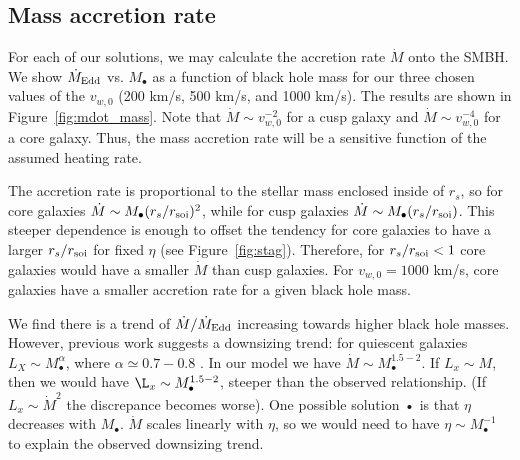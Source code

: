 \documentclass[usenatbib,fleqn]{mn2e}
\newcommand{\Mdot}{\dot{M}}
\newcommand{\eddr}{\dot{M}/\dot{M}_{\rm Edd}}
\newcommand{\Mdote}{\dot{M}_{\rm Edd}}
\newcommand{\rs}{r_s}
\newcommand{\Mbh}[1][]{M_{\bullet#1}}
\newcommand{\soi}{\rm soi}
\newcommand{\rsoi}{r_{\soi}}
\newcommand{\vwO}{v_{w,0}}
\begin{document}
\subsection{Mass accretion rate}
For each of our solutions, we may calculate the accretion rate
$\dot{M}$ onto the SMBH. We show $\Mdote$ vs. $\Mbh$ as a function of
black hole mass for our three chosen values of the $\vwO$ (200 km/s,
500 km/s, and 1000 km/s). The results are shown in
Figure~\ref{fig:mdot_mass}.  Note that $\dot{M}\sim\vwO^{-2}$ for a
cusp galaxy and $\dot{M}\sim\vwO^{-4}$ for a core galaxy. Thus, the
mass accretion rate will be a sensitive function of the assumed
heating rate.

The accretion rate is proportional to the stellar mass enclosed inside
of $\rs$, so for core galaxies $\dot{M}\sim \Mbh (\rs/\rsoi)^{2}$,
while for cusp galaxies $\dot{M}\sim \Mbh (\rs/\rsoi)$.  This steeper
dependence is enough to offset the tendency for core galaxies to have
a larger $\rs/\rsoi$ for fixed $\eta$ (see
Figure~\ref{fig:stag}). Therefore, for $\rs/\rsoi<1$ core galaxies
would have a smaller $\dot{M}$ than cusp galaxies.  For $\vwO=1000$
km/s, core galaxies have a smaller accretion rate for a given black
hole mass.

We find there is a trend of $\eddr$ increasing towards higher black
hole masses. However, previous work suggests a downsizing trend: for
quiescent galaxies $L_X \sim \Mbh^\alpha$, where $\alpha\simeq
0.7-0.8$ \citep{MillerGallo+:2014a}. In our model we have $\Mdot \sim
\Mbh^{1.5-2}$. If $L_x\sim M$, then we would have $\L_x \sim
\Mbh^{1.5-2}$, steeper than the observed relationship. (If $L_x \sim
\Mdot^2$ the discrepance becomes worse).  One possible solution • is
that $\eta$ decreases with $\Mbh$.  $\Mdot$ scales linearly with
$\eta$, so we would need to have $\eta \sim \Mbh^{-1}$ to explain the
observed downsizing trend.
\end{document}
